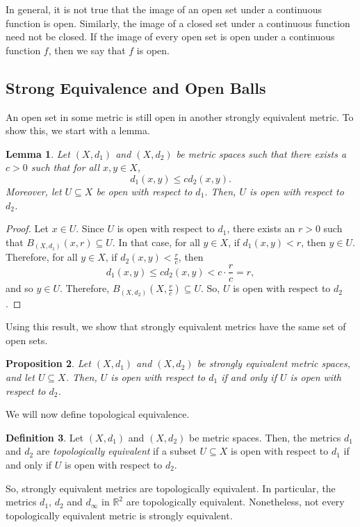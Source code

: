 \documentclass[a4paper, openany]{memoir}
\theoremstyle{definition}
\newtheorem{definition}{Definition}[section]
\theoremstyle{plain}
\newtheorem{lemma}[definition]{Lemma}
\newtheorem{proposition}[definition]{Proposition}
\begin{document}
In general, it is not true that the image of an open set under a continuous function is open. Similarly, the image of a closed set under a continuous function need not be closed. If the image of every open set is open under a continuous function $f$, then we say that $f$ is open.

\subsection{Strong Equivalence and Open Balls}
An open set in some metric is still open in another strongly equivalent metric. To show this, we start with a lemma.
\begin{lemma}
Let $(X, d_1)$ and $(X, d_2)$ be metric spaces such that there exists a $c > 0$ such that for all $x, y \in X$,
\[d_1(x, y) \leqslant cd_2(x, y).\]
Moreover, let $U \subseteq X$ be open with respect to $d_1$. Then, $U$ is open with respect to $d_2$.
\end{lemma}
\begin{proof}
Let $x \in U$. Since $U$ is open with respect to $d_1$, there exists an $r > 0$ such that $B_{(X, d_1)}(x, r) \subseteq U$. In that case, for all $y \in X$, if $d_1(x, y) < r$, then $y \in U$. Therefore, for all $y \in X$, if $d_2(x, y) < \frac{r}{c}$, then
\[d_1(x, y) \leqslant cd_2(x, y) < c \cdot \frac{r}{c} = r,\]
and so $y \in U$. Therefore, $B_{(X, d_2)}(X, \frac{r}{c}) \subseteq U$. So, $U$ is open with respect to $d_2$.
\end{proof}
\noindent Using this result, we show that strongly equivalent metrics have the same set of open sets.
\begin{proposition}
Let $(X, d_1)$ and $(X, d_2)$ be strongly equivalent metric spaces, and let $U \subseteq X$. Then, $U$ is open with respect to $d_1$ if and only if $U$ is open with respect to $d_2$.
\end{proposition}

We will now define topological equivalence.
\begin{definition}
Let $(X, d_1)$ and $(X, d_2)$ be metric spaces. Then, the metrics $d_1$ and $d_2$ are \emph{topologically equivalent} if a subset $U \subseteq X$ is open with respect to $d_1$ if and only if $U$ is open with respect to $d_2$.
\end{definition}
\noindent So, strongly equivalent metrics are topologically equivalent. In particular, the metrics $d_1$, $d_2$ and $d_\infty$ in $\mathbb{R}^2$ are topologically equivalent. Nonetheless, not every topologically equivalent metric is strongly equivalent.
\end{document}
